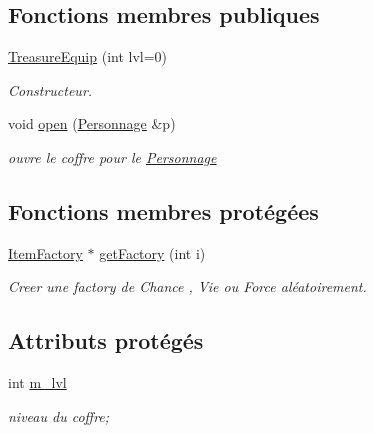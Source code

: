 \subsection*{Fonctions membres publiques}
\begin{DoxyCompactItemize}
\item 
\hyperlink{class_treasure_equip_a690b46e0b0f10d6568a9220b5f320f0f}{Treasure\-Equip} (int lvl=0)
\begin{DoxyCompactList}\small\item\em Constructeur. \end{DoxyCompactList}\item 
void \hyperlink{class_treasure_equip_a187762eb0e25641cde7a2b15d94af4ed}{open} (\hyperlink{class_personnage}{Personnage} \&p)
\begin{DoxyCompactList}\small\item\em ouvre le coffre pour le \hyperlink{class_personnage}{Personnage} \end{DoxyCompactList}\end{DoxyCompactItemize}
\subsection*{Fonctions membres protégées}
\begin{DoxyCompactItemize}
\item 
\hyperlink{class_item_factory}{Item\-Factory} $\ast$ \hyperlink{class_treasure_ab3a8e251ac3ce8524e142e7f93979eb6}{get\-Factory} (int i)
\begin{DoxyCompactList}\small\item\em Creer une factory de Chance , Vie ou Force aléatoirement. \end{DoxyCompactList}\end{DoxyCompactItemize}
\subsection*{Attributs protégés}
\begin{DoxyCompactItemize}
\item 
\hypertarget{class_treasure_a51144d1fb776d1c0612b87d3d8006aa8}{int \hyperlink{class_treasure_a51144d1fb776d1c0612b87d3d8006aa8}{m\-\_\-lvl}}\label{class_treasure_a51144d1fb776d1c0612b87d3d8006aa8}

\begin{DoxyCompactList}\small\item\em niveau du coffre; \end{DoxyCompactList}\end{DoxyCompactItemize}


